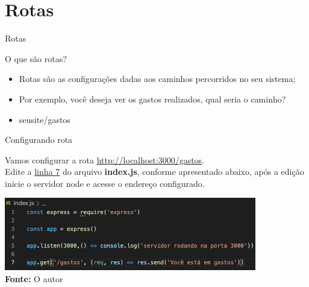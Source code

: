 \documentclass{beamer}
\begin{document}
\section{Rotas}
    \begin{frame}[label=lists]{Rotas}
    \begin{exampleblock}{O que são rotas?}
        	\begin{itemize}
	\item Rotas são as configurações dadas aos caminhos percorridos no seu sistema;
	\item Por exemplo, você deseja ver os gastos realizados, qual seria o caminho?
	\item seusite/gastos
        	\end{itemize}
      \end{exampleblock}
    \end{frame}
    \begin{frame}[label=lists]{Configurando rota}

     
         Vamos configurar a rota  \url{http://localhost:3000/gastos}.\\
          \vspace{0.5cm}
          Edite a \underline{linha 7} do arquivo \textbf{index.js}, conforme apresentado abaixo, após a edição inicie o servidor node e acesse o endereço configurado.
%

	            \includegraphics[width=110mm]{resources/aula3_1.png}\\
            \tiny{\textbf{Fonte:} O autor}

    \end{frame}
\end{document}

